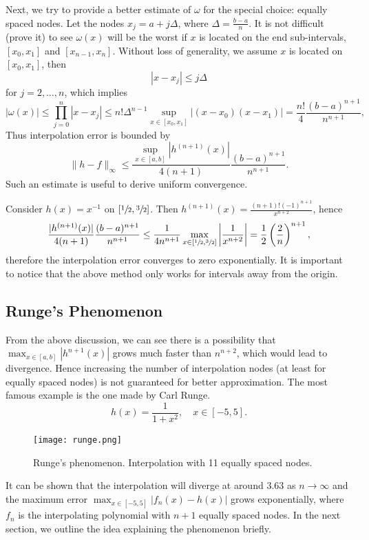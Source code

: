 Next, we try to provide a better estimate of $\omega$ for the special choice: equally spaced nodes.  Let the nodes $x_j = a + j\Delta$, where $\Delta = \frac{b-a}{n}$. It is not difficult (prove it) to see $\omega(x)$ will be the worst if $x$ is located on the end sub-intervals, $[x_0, x_1]$ and $[x_{n-1}, x_n]$. Without loss of generality, we assume $x$ is located on $[x_0, x_1]$, then 
$$|x - x_j|\le j \Delta$$
for $j = 2, \dots, n$, which implies 
\begin{equation}
\label{EQ: MAX-OMEGA}
    |\omega(x)|\le \prod_{j=0}^n |x - x_j|\le n! \Delta^{n-1} \sup_{x\in [x_0, x_1]} |(x - x_0)(x-x_1)|= \frac{n!}{4} \frac{(b-a)^{n+1}}{n^{n+1}},
\end{equation}
Thus interpolation error is bounded by
$$  \|h  - f\|_{\infty} \le  \frac{\sup_{x\in[a,b]}|h^{(n+1)}(x)|}{4(n+1)} \frac{(b-a)^{n+1}}{n^{n+1}}.$$
Such an estimate is useful to derive uniform convergence. 
\begin{example}
    Consider $h(x) = x^{-1}$ on $[\sfrac{1}{2}, \sfrac{3}{2}]$. Then $h^{(n+1)}(x) = \frac{(n+1)!(-1)^{n+1}}{x^{n+2}}$, hence 
    \begin{equation}
        \frac{| h^{(n+1)}(x) |}{4(n+1)}  \frac{(b-a)^{n+1}}{n^{n+1}} \le \frac{1}{4n^{n+1}}\max_{x\in[\sfrac{1}{2}, \sfrac{3}{2}]} \left| \frac{1}{x^{n+2}} \right| = \frac{1}{2} \left(\frac{2}{n}\right)^{n+1},
    \end{equation}
    therefore the interpolation error converges to zero exponentially. It is important to notice that the above method only works for intervals away from the origin. 
\end{example} 

\subsection{Runge's Phenomenon}
\label{SSec: 2-Run-Phe}
From the above discussion, we can see there is a possibility that $\max_{x\in[a,b]}|h^{n+1}(x)|$ grows much faster than $n^{n+2}$, which would lead to divergence. Hence increasing the number of interpolation nodes (at least for equally spaced nodes) is not guaranteed for better approximation. The most famous example is the one made by Carl Runge. 
\begin{equation}
\label{EQ: RUNGE-EXAMPLE}
    h(x) = \frac{1}{1+x^2},\quad x\in [-5, 5].
\end{equation} 
\begin{figure}[!htb]
    \centering
    \texttt{[image: runge.png]}
    \caption{Runge's phenomenon. Interpolation with 11 equally spaced nodes. }
\end{figure}
It can be shown that the interpolation will diverge at around $3.63$ as $n\to \infty$ and the maximum error $\max_{x\in[-5, 5]} |f_n(x) - h(x) |$ grows exponentially, where $f_n$ is the interpolating polynomial with $n+1$ equally spaced nodes. In the next section, we outline the idea explaining the phenomenon briefly. 
